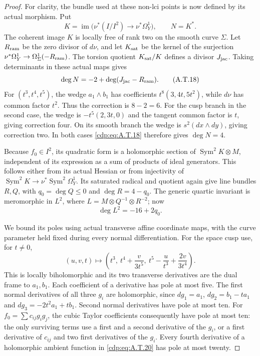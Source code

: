 \begin{proof}
For clarity, the bundle used at these non-lci points
is now defined by its actual morphism. Put
\[
 K=\operatorname{im}\bigl(\nu^*(I/I^2)
                         \longrightarrow\nu^*\Omega_Y^1\bigr),
 \qquad N=K^*.
\]
The coherent image $K$ is locally free of rank two
on the smooth curve $\Sigma$. Let $R_{\rm ram}$ be
the zero divisor of $d\nu$, and let $K_{\rm sat}$
be the kernel of the surjection
$\nu^*\Omega_Y^1\to\Omega_\Sigma^1(-R_{\rm ram})$.
The torsion quotient $K_{\rm sat}/K$ defines a divisor
$J_{\rm jac}$. Taking determinants in these actual
maps gives
\[
 \deg N=-2+\deg(J_{\rm jac}-R_{\rm ram}).         \tag{A.T.18}\label{cdp:eq:A.T.18}
\]
For $(t^3,t^4,t^5)$, the wedge $a_1\wedge b_1$
has coefficients $t^8(3,4t,5t^2)$, while $d\nu$
has common factor $t^2$. Thus the correction is
$8-2=6$. For the cusp branch in the second case,
the wedge is $-t^5(2,3t,0)$ and the tangent common
factor is $t$, giving correction four. On its
smooth branch the wedge is $s^2(dx\wedge dy)$,
giving correction two. In both cases \eqref{cdp:eq:A.T.18}
therefore gives $\deg N=4$.

Because $f_0\in I^2$, its quadratic form is a
holomorphic section of $\operatorname{Sym}^2K\otimes M$,
independent of its expression as a sum of products
of ideal generators. This follows either from its
actual Hessian or from injectivity of
$\operatorname{Sym}^2K\to\nu^*\operatorname{Sym}^2\Omega_Y^1$.
Its saturated radical and quotient again give line
bundles $R,Q$, with $q_0=\deg Q\le0$ and
$\deg R=4-q_0$. The generic quartic invariant
is meromorphic in $L^2$, where
$L=M\otimes Q^{-1}\otimes R^{-2}$; now
\[
                        \deg L^2=-16+2q_0.        \tag{A.T.19}\label{cdp:eq:A.T.19}
\]

We bound its poles using actual transverse affine
coordinate maps, with the curve parameter held
fixed during every normal differentiation. For the
space cusp use, for $t\ne0$,
\[
 (u,v,t)\longmapsto
 \left(t^3,\ t^4+\frac{v}{3t^5},\
                   t^5-\frac{u}{t^3}+\frac{2v}{3t^4}\right).
                                                        \tag{A.T.20}\label{cdp:eq:A.T.20}
\]
This is locally biholomorphic and its two transverse
derivatives are the dual frame to $a_1,b_1$.
Each coefficient of a derivative has pole at most
five. The first normal derivatives of all three
$g_i$ are holomorphic, since
$dg_1=a_1$, $dg_2=b_1-ta_1$ and
$dg_3=-2t^2a_1+t b_1$.
Second normal derivatives have pole at most ten.
For $f_0=\sum c_{ij}g_i g_j$, the cubic Taylor
coefficients consequently have pole at most ten:
the only surviving terms use a first and a second
derivative of the $g_i$, or a first derivative of
$c_{ij}$ and two first derivatives of the $g_i$.
Every fourth derivative of a holomorphic ambient
function in \eqref{cdp:eq:A.T.20} has pole at most twenty.


\end{proof}
